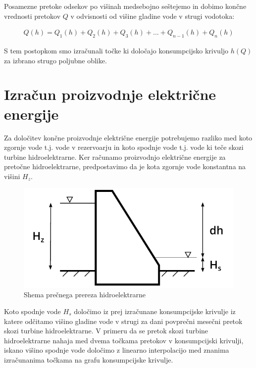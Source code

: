 Posamezne pretoke odsekov po višinah medsebojno seštejemo in dobimo končne vrednosti pretokov $Q$ v odvisnosti od višine gladine vode v strugi vodotoka:

\begin{ceqn}
\begin{align}
Q(h) = Q_1(h) + Q_2(h) + Q_3(h) + ... + Q_{n-1}(h) + Q_n(h)
\end{align}
\end{ceqn}


S tem postopkom smo izračunali točke ki določajo konsumpcijsko krivuljo $h(Q)$ za izbrano strugo poljubne oblike.


\newpage

\section{Izračun proizvodnje električne energije}
Za določitev končne proizvodnje električne energije potrebujemo razliko med koto zgornje vode t.j. vode v rezervoarju in koto spodnje vode t.j. vode ki teče skozi turbine hidroelektrarne. Ker računamo proizvodnjo električne energije za pretočne hidroelektrarne, predpostavimo da je kota zgornje vode konstantna na višini $H_z$.

\begin{figure}[ht!]
	\begin{centering}
		\includegraphics{slike/electricityProduction/powerplant_crossSection.pdf}
		\caption{Shema prečnega prereza hidroelektrarne}
	\end{centering}
\end{figure}

 Koto spodnje vode $H_s$ določimo iz prej izračunane konsumpcijske krivulje iz katere odčitamo višino gladine vode v strugi za dani povprečni mesečni pretok skozi turbine hidroelektrarne. V primeru da se pretok skozi turbine hidroelektrarne nahaja med dvema točkama pretokov v konsumpcijski krivulji, iskano višino spodnje vode določimo z linearno interpolacijo med znanima izračunanima točkama na grafu konsumpcijske krivulje.


